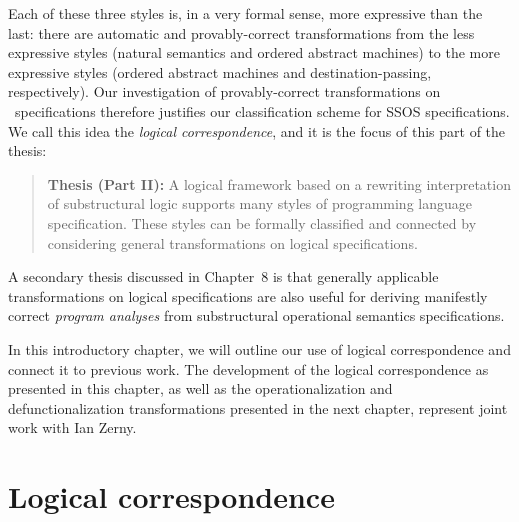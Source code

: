 \noindent
Each of these three styles is, in a very formal sense, more
expressive than the last: there are automatic and
provably-correct transformations from the less expressive styles
(natural semantics and ordered abstract machines) to the more
expressive styles (ordered abstract machines and destination-passing,
respectively).  Our investigation of provably-correct transformations
on \sls~specifications therefore justifies our classification scheme
for SSOS specifications. We call this idea the {\it logical
  correspondence}, and it is the focus of this part of the thesis:

\smallskip
\begin{quote} 
  {\bf Thesis (Part II):} A logical framework based on a rewriting
  interpretation of substructural logic supports many styles of
  programming language specification. These styles can be formally
  classified and connected by considering general transformations on
  logical specifications.
\end{quote} 

\noindent
A secondary thesis discussed in Chapter~8 is that generally
applicable transformations on logical specifications are also useful
for deriving manifestly correct {\it program analyses} from
substructural operational semantics specifications.


In this introductory chapter, we will outline our use of logical
correspondence and connect it to previous work. The development of the
logical correspondence as presented in this chapter, as well as the
operationalization and defunctionalization transformations presented
in the next chapter, represent joint work with Ian Zerny.



\section{Logical correspondence}

